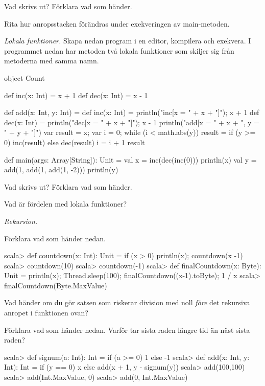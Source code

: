 \Subtask Vad skrivs ut? Förklara vad som händer.

\Subtask\Pen Rita hur anropsstacken förändras under exekveringen av main-metoden.


\Task \emph{Lokala funktioner.} Skapa nedan program i en editor, kompilera och exekvera. I programmet nedan har metoden  två lokala funktioner som skiljer sig från metoderna med samma namn. 
\begin{Code}
object Count {
  def inc(x: Int) = x + 1
  def dec(x: Int) = x - 1

  def add(x: Int, y: Int) = {
    def inc(x: Int) = {println("inc[x = " + x + "]"); x + 1}
    def dec(x: Int) = {println("dec[x = " + x + "]"); x - 1}
    println("add[x = " + x + ", y = " + y + "]")
    var result = x; 
    var i = 0; 
    while (i < math.abs(y)){
      result = if (y >= 0) inc(result) else dec(result)
      i = i + 1
    }
    result
  }

  def main(args: Array[String]): Unit = {
    val x =  inc(dec(inc(0)))
    println(x)
    val y = add(1, add(1, add(1, -2)))
    println(y)
  }
}
\end{Code}

\Subtask Vad skrivs ut? Förklara vad som händer.

\Subtask\Pen Vad är fördelen med lokala funktioner?



\Task \emph{Rekursion.} 

\Subtask Förklara vad som händer nedan. 

\begin{REPL}
scala> def countdown(x: Int): Unit = if (x > 0) {println(x); countdown(x -1)}
scala> countdown(10)
scala> countdown(-1)
scala> def finalCountdown(x: Byte): Unit = 
         {println(x); Thread.sleep(100); finalCountdown((x-1).toByte); 1 / x}
scala> finalCountdown(Byte.MaxValue)
\end{REPL}

\Subtask Vad händer om du gör satsen som riskerar division med noll \emph{före} det rekursiva anropet i funktionen  ovan?

\Subtask Förklara vad som händer nedan. Varför tar sista raden längre tid än näst sista raden?
\begin{REPL}
scala> def signum(a: Int): Int = if (a >= 0) 1 else -1 
scala> def add(x: Int, y: Int): Int = 
         if (y == 0) x else add(x + 1, y - signum(y))
scala> add(100,100)
scala> add(Int.MaxValue, 0)
scala> add(0, Int.MaxValue)
\end{REPL}



